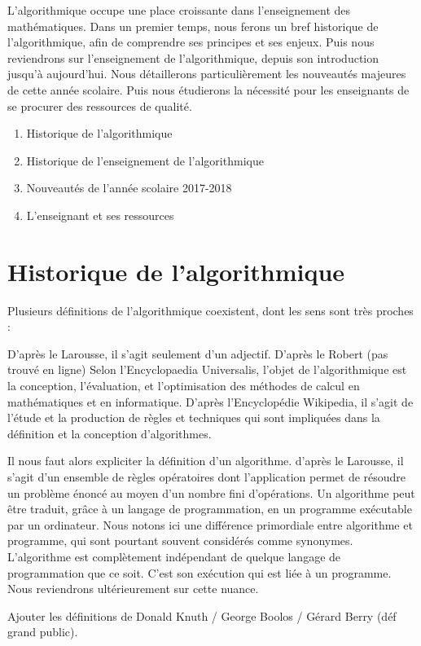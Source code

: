 \documentclass[a4paper, 12pt, appendixprefix=true]{scrreprt}%
\begin{document}
L'algorithmique occupe une place croissante dans l'enseignement des mathématiques. 
Dans un premier temps, nous ferons un bref historique de l'algorithmique, afin de comprendre ses principes et ses enjeux.
Puis nous reviendrons sur l'enseignement de l'algorithmique, depuis son introduction jusqu'à aujourd'hui. Nous détaillerons particulièrement les nouveautés majeures de cette année scolaire.
Puis nous étudierons la nécessité pour les enseignants de se procurer des ressources de qualité.
\begin{enumerate}
	\item Historique de l'algorithmique
	\item Historique de l'enseignement de l'algorithmique
	\item Nouveautés de l'année scolaire 2017-2018
	\item L'enseignant et ses ressources
\end{enumerate}

\section{Historique de l'algorithmique}
Plusieurs définitions de l'algorithmique coexistent, dont les sens sont très proches :

D'après le Larousse, il s'agit seulement d'un adjectif.
D'après le Robert (pas trouvé en ligne)
Selon l'Encyclopaedia Universalis, l'objet de l'algorithmique est la conception, l'évaluation, et l'optimisation des méthodes de calcul en mathématiques et en informatique.
D'après l'Encyclopédie Wikipedia, il s'agit de l'étude et la production de règles et techniques qui sont impliquées dans la définition et la conception d'algorithmes.

Il nous faut alors expliciter la définition d'un algorithme.
d'après le Larousse, il s'agit d'un ensemble de règles opératoires dont l'application permet de résoudre un problème énoncé au moyen d'un nombre fini d'opérations. Un algorithme peut être traduit, grâce à un langage de programmation, en un programme exécutable par un ordinateur.
Nous notons ici une différence primordiale entre algorithme et programme, qui sont pourtant souvent considérés comme synonymes.
L'algorithme est complètement indépendant de quelque langage de programmation que ce soit. C'est son exécution qui est liée à un programme. Nous reviendrons ultérieurement sur cette nuance.

Ajouter les définitions de Donald Knuth / George Boolos / Gérard Berry (déf grand public).
\end{document}
